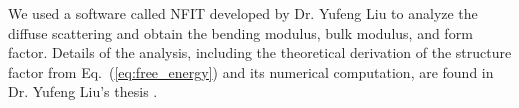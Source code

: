 We used a software called NFIT developed by Dr. Yufeng Liu
\cite{Lyatskaya01,Liu04,Liu03} to analyze the diffuse scattering and
obtain the bending modulus, bulk modulus, and form factor. 
Details of the analysis, including the theoretical derivation of
the structure factor from Eq.~(\ref{eq:free_energy}) and its
numerical computation, are found in Dr. Yufeng Liu's thesis 
\cite{Liu03}. 

%
%
